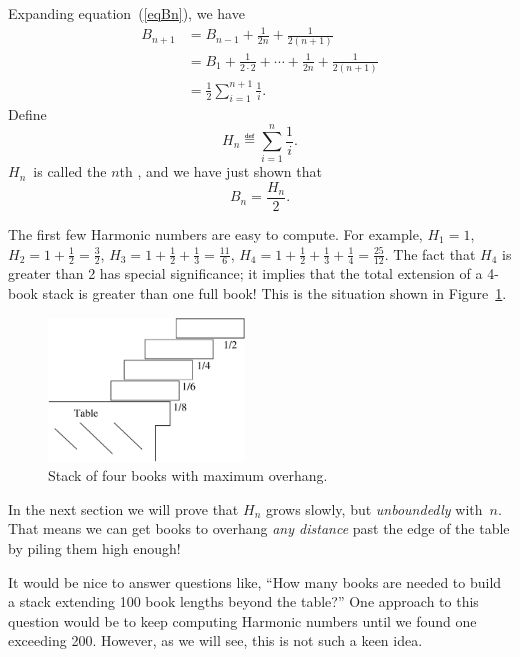 Expanding equation~(\ref{eqBn}), we have
\begin{align*}
B_{n+1} & = B_{n-1} + \frac{1}{2n} + \frac{1}{2(n+1)}\\
        & = B_1 + \frac{1}{2 \cdot 2} + \cdots + \frac{1}{2n} +
            \frac{1}{2(n+1)}\\
        & = \frac{1}{2}\sum_{i=1}^{n+1} \frac{1}{i}.
\end{align*}
Define
\[
H_n \eqdef \sum_{i=1}^n \frac{1}{i}.
\]
$H_n$~is called the $n$th , and we have just shown
that
\[
B_n = \frac{H_n}{2}.
\]

The first few Harmonic numbers are easy to compute.  For example, $H_1
= 1$, $H_2 = 1 + \frac{1}{2} = \frac{3}{2}$, $H_3 = 1 + \frac{1}{2} +
\frac{1}{3} = \frac{11}{6}$, $H_4 = 1 + \frac{1}{2} + \frac{1}{3} +
\frac{1}{4} = \frac{25}{12}$.  The fact that $H_4$ is greater than 2 has
special significance; it implies that the total extension of a 4-book
stack is greater than one full book!  This is the situation shown in
Figure~\ref{fig:optstack}.

\begin{figure}[htbp]
\centerline{\includegraphics[height=1.5in]{figures/optstack}}
\caption{Stack of four books with maximum overhang.}
\label{fig:optstack}
\end{figure}

In the next section we will prove that $H_n$ grows slowly, but
\emph{unboundedly} with~$n$.  That means we can get books to overhang
\emph{any distance} past the edge of the table by piling them high enough!


It would be nice to answer questions like, ``How many books are needed
to build a stack extending 100 book lengths beyond the table?''  One
approach to this question would be to keep computing Harmonic numbers
until we found one exceeding 200.  However, as we will see, this is
not such a keen idea.

